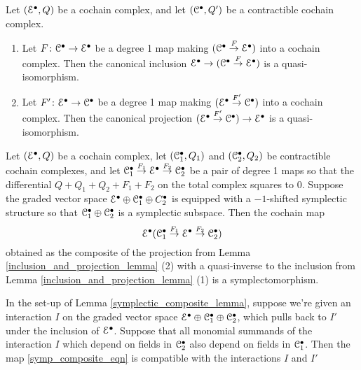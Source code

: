 \documentclass[10pt, oneside]{article}
\begin{document}
\begin{lemma} \label{inclusion_and_projection_lemma}
Let $(\mathcal{E}^\bullet, Q)$ be a cochain complex, and let $(\mathcal{C}^\bullet, Q')$ be a contractible cochain complex.
\begin{enumerate}
 \item Let $F \colon \mathcal{C}^\bullet \to \mathcal{E}^\bullet$ be a degree 1 map making $(\mathcal{C}^\bullet \overset F\to \mathcal{E}^\bullet)$ into a cochain complex.  Then the canonical inclusion $\mathcal{E}^\bullet \to (\mathcal{C}^\bullet \overset F\to \mathcal{E}^\bullet)$ is a quasi-isomorphism.
 \item Let $F' \colon \mathcal{E}^\bullet \to \mathcal{C}^\bullet$ be a degree 1 map making $(\mathcal{E}^\bullet \overset {F'}\to \mathcal{C}^\bullet)$ into a cochain complex.  Then the canonical projection $(\mathcal{E}^\bullet \overset {F'}\to \mathcal{C}^\bullet) \to \mathcal{E}^\bullet$ is a quasi-isomorphism.
\end{enumerate}
\end{lemma}

\begin{lemma} \label{symplectic_composite_lemma}
Let $(\mathcal{E}^\bullet,Q)$ be a cochain complex, let $(\mathcal{C}_1^\bullet, Q_1)$ and $(\mathcal{C}_2^\bullet, Q_2)$ be contractible cochain complexes, and let $\mathcal{C}_1^\bullet \overset{F_1}\to \mathcal{E}^\bullet \overset{F_2}\to \mathcal{C}_2^\bullet$ be a pair of degree 1 maps so that the differential $Q + Q_1 + Q_2 + F_1 + F_2$ on the total complex squares to 0.  Suppose the graded vector space $\mathcal{E}^\bullet \oplus \mathcal{C}_1^\bullet \oplus C_2^\bullet$ is equipped with a $-1$-shifted symplectic structure so that $\mathcal{C}_1^\bullet \oplus \mathcal{C}_2^\bullet$ is a symplectic subspace.  Then the cochain map 
\begin{equation}
\label{symp_composite_eqn}\mathcal{E}^\bullet (\mathcal{C}_1^\bullet \overset{F_1}\to \mathcal{E}^\bullet \overset{F_2}\to \mathcal{C}_2^\bullet)
\end{equation}
obtained as the composite of the projection from Lemma \ref{inclusion_and_projection_lemma} (2) with a quasi-inverse to the inclusion from Lemma \ref{inclusion_and_projection_lemma} (1) is a symplectomorphism.
\end{lemma}

\begin{lemma} \label{interaction_pullback_lemma}
In the set-up of Lemma \ref{symplectic_composite_lemma}, suppose we're given an interaction $I$ on the graded vector space $\mathcal{E}^\bullet \oplus \mathcal{C}_1^\bullet \oplus \mathcal{C}_2^\bullet$, which pulls back to $I'$ under the inclusion of $\mathcal{E}^\bullet$.  Suppose that all monomial summands of the interaction $I$ which depend on fields in $\mathcal{C}_2^\bullet$ also depend on fields in $\mathcal{C}_1^\bullet$. Then the map \ref{symp_composite_eqn} is compatible with the interactions $I$ and $I'$
\end{lemma}
\end{document}
